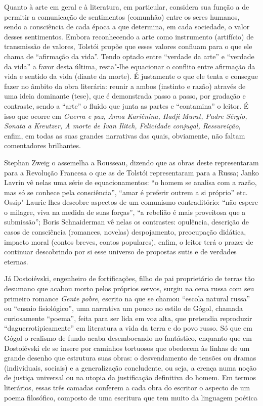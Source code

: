 Quanto à arte em geral e à literatura, em particular, considera sua
função a de permitir a comunicação de sentimentos (comunhão) entre os
seres humanos, sendo a consciência de cada época a que determina, em
cada sociedade, o valor desses sentimentos. Embora reconhecendo a arte
como instrumento (artifício) de transmissão de valores, Tolstói propõe
que esses valores confluam para o que ele chama de ``afirmação da
vida''. Tendo optado entre ``verdade da arte'' e ``verdade da vida''
a favor desta última, resta"-lhe equacionar o conflito entre afirmação da
vida e sentido da vida (diante da morte). É justamente o que ele tenta e
consegue fazer no âmbito da obra literária: reunir a ambos (instinto e
razão) através de uma ideia dominante (tese), que é demonstrada passo a
passo, por gradação e contraste, sendo a ``arte'' o fluido que junta as
partes e ``contamina'' o leitor. É isso que ocorre em \emph{Guerra e
paz, Anna Kariênina, Hadji Murat, Padre Sérgio, Sonata a Kreutzer, A
morte de Ivan Ilitch, Felicidade conjugal, Ressureição}, enfim, em todas
as suas grandes narrativas das quais, obviamente, não faltam comentadores
brilhantes.

Stephan Zweig o assemelha a Rousseau, dizendo que as obras deste
representaram para a Revolução Francesa o que as de Tolstói
representaram para a Russa; Janko Lavrin vê nelas uma série de
equacionamentos: ``o homem se analisa com a razão, mas só se conhece
pela consciência'', ``amar é preferir outrem a si próprio'' etc. Ossip"-Laurie lhes descobre aspectos de um
comunismo contraditório: ``não espere o milagre, viva na medida de
suas forças'', ``a rebelião é mais proveitosa que a submissão''; Boris
Schnaiderman vê nelas os contrastes: opulência, descrição de casos de
consciência (romances, novelas)  despojamento, preocupação didática,
impacto moral (contos breves, contos populares), enfim, o leitor terá o
prazer de continuar descobrindo por si esse universo de propostas sutis
e de verdades eternas.

Já Dostoiévski, engenheiro de fortificações, filho de pai proprietário
de terras tão desumano que acabou morto pelos próprios servos, surgiu na
cena russa com seu primeiro romance \emph{Gente pobre,} escrito na que
se chamou ``escola natural russa'' ou ``ensaio fisiológico'', uma narrativa um pouco no estilo de Gógol,
chamada curiosamente ``poema'', feita para ser lida em voz alta, que
pretendia reproduzir ``daguerrotipicamente'' em literatura a vida da terra e do povo russo.
Só que em Gógol o realismo de fundo acaba desembocando no fantástico,
enquanto que em Dostoiévski ele se insere por caminhos tortuosos que
obedecem às linhas de um grande desenho que estrutura suas obras: o
desvendamento de tensões ou dramas (individuais, sociais) e a generalização concludente, ou seja, a crença
numa noção de justiça universal ou na utopia da justificação definitiva
do homem. Em termos literários, essas três camadas conferem a cada obra
do escritor o aspecto de um poema filosófico, composto de uma escritura
que tem muito da linguagem poética

